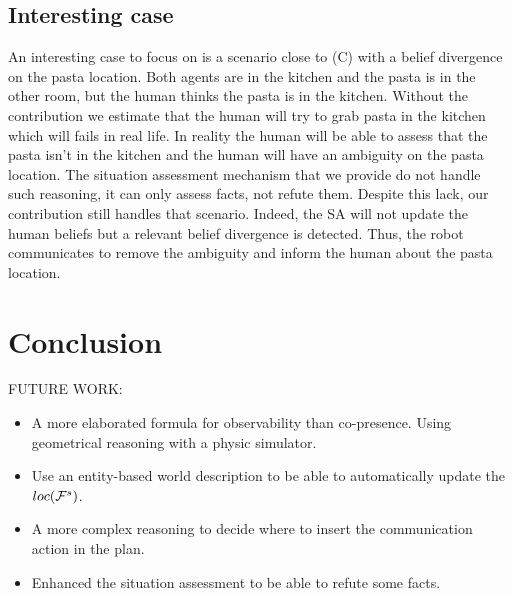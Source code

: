 \documentclass[letterpaper]{article} %
\begin{document}
\subsection{Interesting case}

An interesting case to focus on is a scenario close to (C) with a belief divergence on the pasta location. Both agents are in the kitchen and the pasta is in the other room, but the human thinks the pasta is in the kitchen. Without the contribution we estimate that the human will try to grab pasta in the kitchen which will fails in real life. In reality the human will be able to assess that the pasta isn't in the kitchen and the human will have an ambiguity on the pasta location. The situation assessment mechanism that we provide do not handle such reasoning, it can only assess facts, not refute them. Despite this lack, our contribution still handles that scenario. Indeed, the SA will not update the human beliefs but a relevant belief divergence is detected. Thus, the robot communicates to remove the ambiguity and inform the human about the pasta location.  

\section{Conclusion}

FUTURE WORK:
\begin{itemize}
    \item A more elaborated formula for observability than co-presence. Using geometrical reasoning with a physic simulator.
    \item Use an entity-based world description to be able to automatically update the $loc(\mathcal{F}^{s}_{}{})$.
    \item A more complex reasoning to decide where to insert the communication action in the plan.
    \item Enhanced the situation assessment to be able to refute some facts.
\end{itemize}


\end{document}
